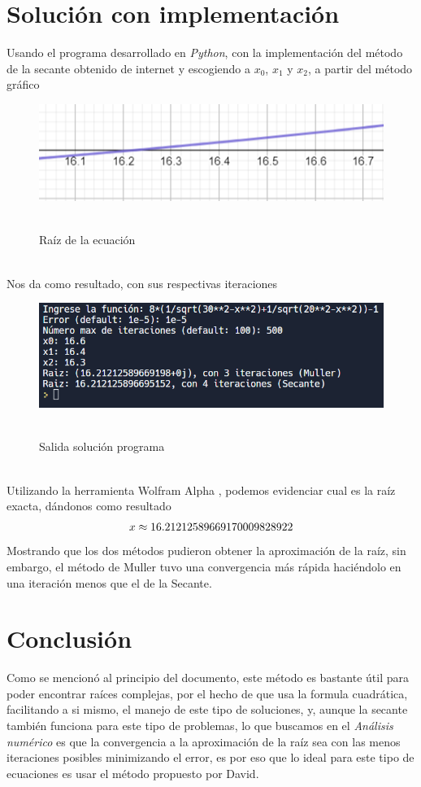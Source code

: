 \documentclass[ceqn,10pt]{SelfArx}
\begin{document}
\section{Solución con implementación}
Usando el programa desarrollado en \emph{Python}, con la 
implementación del método de la secante obtenido de internet y escogiendo
 a $x_{0}$, $x_{1}$ y $x_{2}$, a partir del método gráfico \cite{gg2} 
 \begin{figure}[ht]\centering
	\includegraphics[scale=0.6]{graficoEcuacion.png}\\\
	\caption{Raíz de la ecuación}
	\label{fig:raicesGraf}
\end{figure}\\
 Nos da como resultado, con sus respectivas iteraciones
\begin{figure}[ht]\centering
	\includegraphics[scale=0.5]{solucionPython.png}\\\
	\caption{Salida solución programa}
	\label{fig:fotoPython}
\end{figure}\\
Utilizando la herramienta Wolfram Alpha \cite{wolfram}, podemos
evidenciar cual es la raíz exacta, dándonos como resultado
\begin{equation} \label{eq:wolfram}
\begin{aligned}
	x \approx 16.21212589669170009828922\notag
\end{aligned}
\end{equation}
Mostrando que los dos métodos pudieron obtener la
aproximación de la  raíz, sin embargo, el método de Muller 
tuvo una convergencia más rápida haciéndolo en una iteración menos que el de la Secante.
\section{Conclusión}
Como se mencionó al principio del documento, este método es bastante útil
para poder encontrar raíces complejas, por el hecho de que usa la formula cuadrática,
facilitando a si mismo, el manejo de este tipo de soluciones, y, aunque la secante también
funciona para este tipo de problemas, lo que buscamos en el \textit{Análisis numérico}
es que la convergencia a la aproximación de la raíz sea con las menos iteraciones posibles
minimizando el error, es por eso que lo ideal para este tipo de ecuaciones es usar el método
propuesto por David.
\phantomsection


\end{document}
